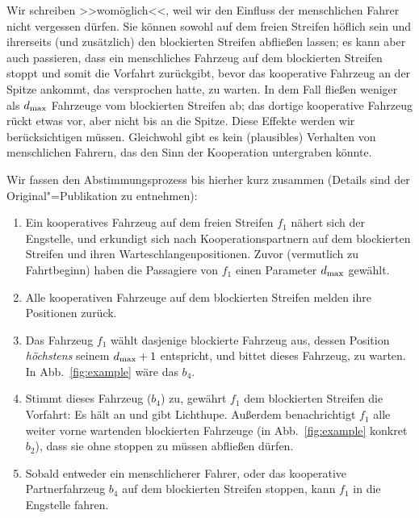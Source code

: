 Wir schreiben >>womöglich<<, weil wir den Einfluss der menschlichen Fahrer nicht vergessen dürfen. Sie können sowohl auf dem freien Streifen höflich sein und ihrerseits (und zusätzlich) den blockierten Streifen abfließen lassen; es kann aber auch passieren, dass ein menschliches Fahrzeug auf dem blockierten Streifen stoppt und somit die Vorfahrt zurückgibt, bevor das kooperative Fahrzeug an der Spitze ankommt, das versprochen hatte, zu warten. In dem Fall fließen weniger als ${d}_{\text{max}}$ Fahrzeuge vom blockierten Streifen ab; das dortige kooperative Fahrzeug rückt etwas vor, aber nicht bis an die Spitze. Diese Effekte werden wir berücksichtigen müssen. Gleichwohl gibt es kein (plausibles) Verhalten von menschlichen Fahrern, das den Sinn der Kooperation untergraben könnte.


Wir fassen den Abstimmungsprozess bis hierher kurz zusammen (Details sind der Original"=Publikation zu entnehmen):

\begin{enumerate}
	\item Ein kooperatives Fahrzeug auf dem freien Streifen $f_1$ nähert sich der Engstelle, und erkundigt sich nach Kooperationspartnern auf dem blockierten Streifen und ihren Warteschlangenpositionen. Zuvor (vermutlich zu Fahrtbeginn) haben die Passagiere von $f_1$ einen Parameter ${d}_{\text{max}}$ gewählt.
	\item Alle kooperativen Fahrzeuge auf dem blockierten Streifen melden ihre Positionen zurück.
	\item Das Fahrzeug $f_1$ wählt dasjenige blockierte Fahrzeug aus, dessen Position \emph{höchstens} seinem ${d}_{\text{max}}+1$ entspricht, und bittet dieses Fahrzeug, zu warten. In Abb.~\ref{fig:example} wäre das $b_4$.
	\item Stimmt dieses Fahrzeug ($b_4$) zu, gewährt $f_1$ dem blockierten Streifen die Vorfahrt: Es hält an und gibt Lichthupe. Außerdem benachrichtigt $f_1$ alle weiter vorne wartenden blockierten Fahrzeuge (in Abb.~\ref{fig:example} konkret $b_2$), dass sie ohne stoppen zu müssen abfließen dürfen.
	\item Sobald entweder ein menschlicherer Fahrer, oder das kooperative Partnerfahrzeug $b_4$ auf dem blockierten Streifen stoppen, kann $f_1$ in die Engstelle fahren.
\end{enumerate}

